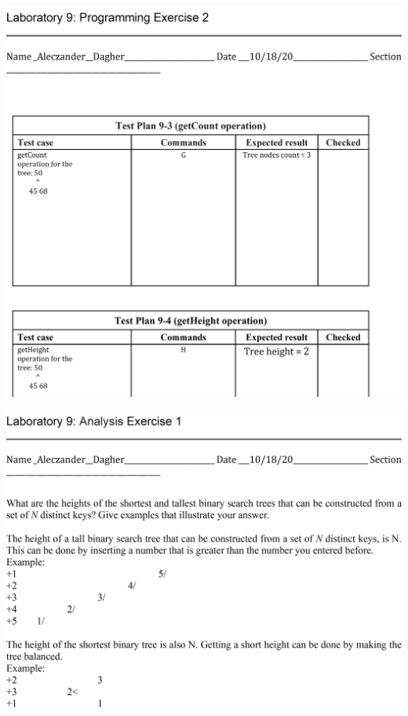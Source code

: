 \begin{DoxyImageNoCaption}
  \mbox{\includegraphics[width=17cm]{Lab9Sheet4.png}}
\end{DoxyImageNoCaption}



\begin{DoxyImageNoCaption}
  \mbox{\includegraphics[width=17cm]{Lab9Sheet5.png}}
\end{DoxyImageNoCaption}



